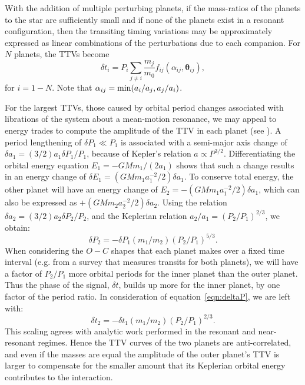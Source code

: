 \documentclass[graybox,natbib,nosecnum]{svmult}
\begin{document}
With the addition of multiple perturbing planets, if the mass-ratios of the planets to the star are
sufficiently small and if none of the planets exist in a resonant configuration, then the transiting timing 
variations may be approximately expressed as linear combinations of the perturbations due to each companion.
For $N$ planets, the TTVs become
\begin{equation}
\delta t_i = P_i \sum_{j \ne i}  \frac{m_j}{m_0} f_{ij}(\alpha_{ij},\mathbf{\theta}_{ij}),
\end{equation}
for $i=1-N$.
Note that $\alpha_{ij} = {\rm min}(a_i/a_j,a_j/a_i)$.

For the largest TTVs, those caused by orbital period changes associated with librations of the system about a mean-motion resonance, we may appeal to energy trades to compute the amplitude of the TTV in each planet (see \citealt{2005MNRAS.359..567A,2010Sci...330...51H}).  A period lengthening of $\delta P_1 \ll P_1$ is associated with a semi-major axis change of $\delta a_1 = (3/2) a_1 \delta P_1 / P_1$, because of Kepler's relation $a \propto P^{3/2}$.  Differentiating the orbital energy equation $E_1=-G M m_1 /(2a_1)$ shows that such a change results in an energy change of $\delta E_1=(GMm_1 a_1^{-2}/2) \delta a_1$.  To conserve total energy, the other planet will have an energy change of $E_2=-(GMm_1 a_1^{-2}/2) \delta a_1$, which can also be expressed as $+(GMm_2 a_2^{-2}/2)\delta a_2$.  Using the relation $\delta a_2 = (3/2) a_2 \delta P_2 / P_2$, and the Keplerian relation $a_2/a_1=(P_2/P_1)^{2/3}$, we obtain: 
\begin{equation}
\delta P_2 = -\delta P_1 (m_1/m_2) (P_2/P_1)^{5/3}. \label{eqn:deltaP}
\end{equation}
When considering the $O-C$ shapes that each planet makes over a fixed time interval (e.g. from a survey that measures transits for both planets), we will have a factor of $P_2/P_1$ more orbital periods for the inner planet than the outer planet.  Thus the phase of the signal, $\delta t$, builds up more for the inner planet, by one factor of the period ratio. In consideration of equation~\ref{eqn:deltaP}, we are left with: 
\begin{equation}
\delta t_2 = -\delta t_1 (m_1/m_2) (P_2/P_1)^{2/3}. \label{eqn:deltat}
\end{equation}
This scaling agrees with analytic work performed in the resonant \citep{2016ApJ...823...72N} and near-resonant \citep{2012ApJ...761..122L} regimes. Hence the TTV curves of the two planets are anti-correlated, and even if the masses are equal the amplitude of the outer planet's TTV is larger to compensate for the smaller amount that its Keplerian orbital energy contributes to the interaction. 
\end{document}

